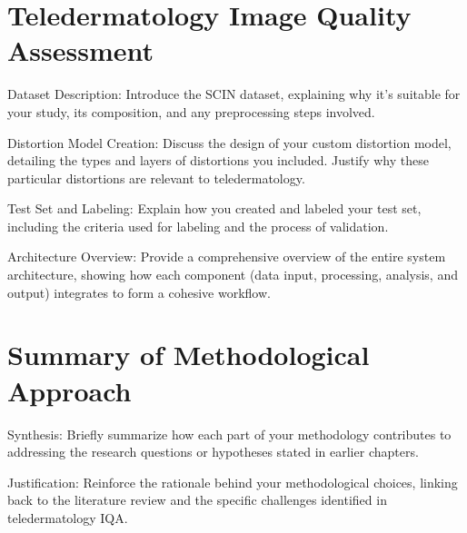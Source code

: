 \section{Teledermatology Image Quality Assessment}
\label{sec:TeledermatologyMethodology}
Dataset Description: Introduce the SCIN dataset, explaining why it's suitable for your study, its composition, and any preprocessing steps involved.\par
\vspace{\baselineskip}
\noindent
Distortion Model Creation: Discuss the design of your custom distortion model, detailing the types and layers of distortions you included. Justify why these particular distortions are relevant to teledermatology.\par
\vspace{\baselineskip}
\noindent
Test Set and Labeling: Explain how you created and labeled your test set, including the criteria used for labeling and the process of validation.\par
\vspace{\baselineskip}
\noindent
Architecture Overview: Provide a comprehensive overview of the entire system architecture, showing how each component (data input, processing, analysis, and output) integrates to form a cohesive workflow. \par
\vspace{\baselineskip}
\noindent

\section{Summary of Methodological Approach}
\label{sec:SummaryMethodology}
Synthesis: Briefly summarize how each part of your methodology contributes to addressing the research questions or hypotheses stated in earlier chapters.\par
\vspace{\baselineskip}
\noindent
Justification: Reinforce the rationale behind your methodological choices, linking back to the literature review and the specific challenges identified in teledermatology IQA.\par